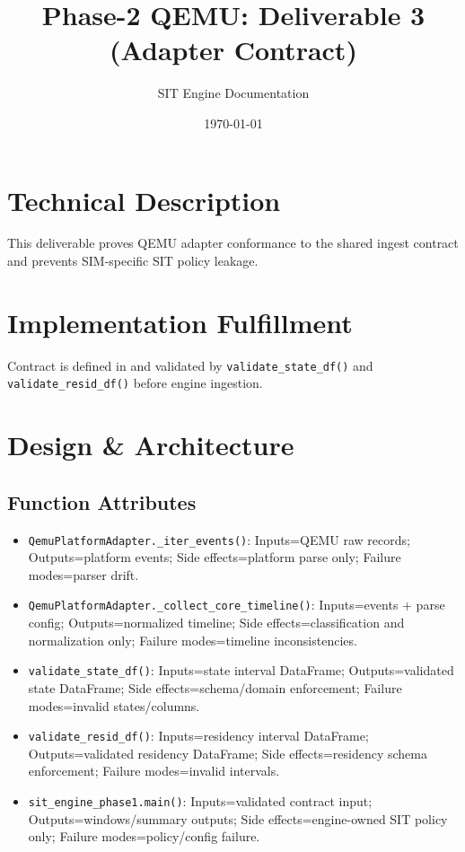 \documentclass[11pt,a4paper]{article}
\title{Phase-2 QEMU: Deliverable 3 (Adapter Contract)}
\author{SIT Engine Documentation}
\date{\today}
\newcommand{\codepath}[1]{\path{#1}}
\begin{document}
\maketitle

\section{Technical Description}
This deliverable proves QEMU adapter conformance to the shared ingest contract and prevents SIM-specific SIT policy leakage.

\section{Implementation Fulfillment}
Contract is defined in \codepath{Phase-2/ADAPTERS.md} and validated by \texttt{validate\_state\_df()} and \texttt{validate\_resid\_df()} before engine ingestion.

\section{Design \& Architecture}
\subsection*{Function Attributes}
\begin{itemize}[leftmargin=*]
  \item \texttt{QemuPlatformAdapter.\_iter\_events()}: Inputs=QEMU raw records; Outputs=platform events; Side effects=platform parse only; Failure modes=parser drift.
  \item \texttt{QemuPlatformAdapter.\_collect\_core\_timeline()}: Inputs=events + parse config; Outputs=normalized timeline; Side effects=classification and normalization only; Failure modes=timeline inconsistencies.
  \item \texttt{validate\_state\_df()}: Inputs=state interval DataFrame; Outputs=validated state DataFrame; Side effects=schema/domain enforcement; Failure modes=invalid states/columns.
  \item \texttt{validate\_resid\_df()}: Inputs=residency interval DataFrame; Outputs=validated residency DataFrame; Side effects=residency schema enforcement; Failure modes=invalid intervals.
  \item \texttt{sit\_engine\_phase1.main()}: Inputs=validated contract input; Outputs=windows/summary outputs; Side effects=engine-owned SIT policy only; Failure modes=policy/config failure.
\end{itemize}
\end{document}
